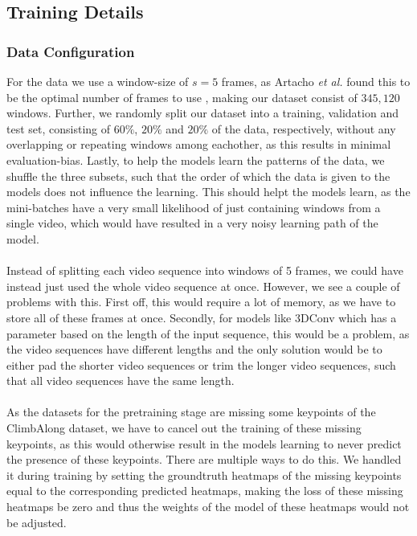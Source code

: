 \documentclass[./main.tex]{subfiles}
\begin{document}
\subsection{Training Details}
\label{subsubsec:training_details}
\subsubsection{Data Configuration} For the data we use a window-size of $s = 5$ frames, as Artacho \textit{et al.} found this to be the optimal number of frames to use \cite{https://doi.org/10.48550/arxiv.2001.08095}, making our dataset consist of $345,120$ windows. Further, we randomly split our dataset into a training, validation and test set, consisting of $60\%$, $20\%$ and $20\%$ of the data, respectively, without any overlapping or repeating windows among eachother, as this results in minimal evaluation-bias. Lastly, to help the models learn the patterns of the data, we shuffle the three subsets, such that the order of which the data is given to the models does not influence the learning. This should helpt the models learn, as the mini-batches have a very small likelihood of just containing windows from a single video, which would have resulted in a very noisy learning path of the model.
\\
\\
Instead of splitting each video sequence into windows of 5 frames, we could have instead just used the whole video sequence at once. However, we see a couple of problems with this. First off, this would require a lot of memory, as we have to store all of these frames at once. Secondly, for models like 3DConv which has a parameter based on the length of the input sequence, this would be a problem, as the video sequences have different lengths and the only solution would be to either pad the shorter video sequences or trim the longer video sequences, such that all video sequences have the same length.
\\
\\
As the datasets for the pretraining stage are missing some keypoints of the ClimbAlong dataset, we have to cancel out the training of these missing keypoints, as this would otherwise result in the models learning to never predict the presence of these keypoints. There are multiple ways to do this. We handled it during training by setting the groundtruth heatmaps of the missing keypoints equal to the corresponding predicted heatmaps, making the loss of these missing heatmaps be zero and thus the weights of the model of these heatmaps would not be adjusted. 
\end{document}
